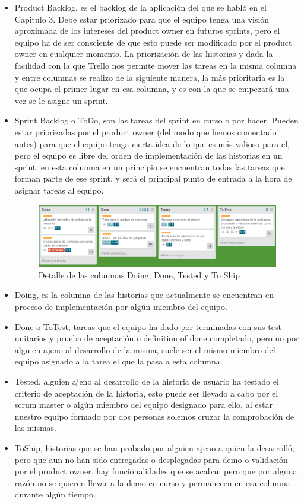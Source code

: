 \documentclass[../pfc.tex]{subfiles}
\begin{document}
	\begin{itemize} 
		\item Product Backlog, es el backlog de la aplicación del que se habló en el Capitulo 3. Debe estar priorizado para que el equipo tenga una visión aproximada de los intereses del product owner en futuros sprints, pero el equipo ha de ser consciente de que esto puede ser modificado por el product owner en cualquier momento. La priorización de las historias y dada la facilidad con la que Trello nos permite mover las tareas en la misma columna y entre columnas se realizo de la siguiente manera, la más prioritaria es la que ocupa el primer lugar en esa columna, y es con la que se empezará una vez se le asigne un sprint.
		\item Sprint Backlog o ToDo, son las tareas del sprint en curso o por hacer. Pueden estar priorizadas por el product owner (del modo que hemos comentado antes) para que el equipo tenga cierta idea de lo que es más valioso para el, pero el equipo es libre del orden de implementación de las historias en un sprint, en esta columna en un principio se encuentran todas las tareas que forman parte de ese sprint, y será el principal punto de entrada a la hora de asignar tareas al equipo. 
		
		\begin{figure}[H]
			\centering
			\includegraphics[width=1\linewidth]{../images/do_done}
			\caption{Detalle de las columnas Doing, Done, Tested y To Ship}
			\label{fig:trelloDDTT}
		\end{figure}
		
		\item Doing, es la columna de las historias que actualmente se encuentran en proceso de implementación por algún miembro del equipo.
		\item Done o ToTest, tareas que el equipo ha dado por terminadas con sus test unitarios y prueba de aceptación o definition of done completado, pero no por alguien ajeno al desarrollo de la misma, suele ser el mismo miembro del equipo asignado a la tarea el que la pasa a esta columna. 
		\item Tested, alguien ajeno al desarrollo de la historia de usuario ha testado el criterio de aceptación de la historia, esto puede ser llevado a cabo por el scrum master o algún miembro del equipo designado para ello, al estar nuestro equipo formado por dos personas solemos cruzar la comprobación de las mismas. 
		\item ToShip, historias que se han probado por alguien ajeno a quien la desarrolló, pero que aun no han sido entregadas o desplegadas para demo o validación por el product owner, hay funcionalidades que se acaban pero que por alguna razón no se quieren llevar a la demo en curso y permanecen en esa columna durante algún tiempo.
		

\end{itemize}
\end{document}
